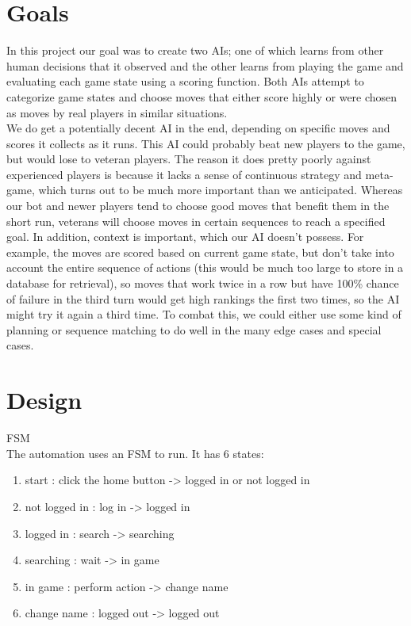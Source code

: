 \documentclass[12pt]{article}
\begin{document}
\section{Goals}
In this project our goal was to create two AIs; one of which learns from other human decisions that it observed and the other learns from playing the game and evaluating each game state using a scoring function.  Both AIs attempt to categorize game states and choose moves that either score highly or were chosen as moves by real players in similar situations. \\

We do get a potentially decent AI in the end, depending on specific moves and scores it collects as it runs.  This AI could probably beat new players to the game, but would lose to veteran players.  The reason it does pretty poorly against experienced players is because it lacks a sense of continuous strategy and meta-game, which turns out to be much more important than we anticipated.  Whereas our bot and newer players tend to choose good moves that benefit them in the short run, veterans will choose moves in certain sequences to reach a specified goal.  In addition, context is important, which our AI doesn't possess.  For example, the moves are scored based on current game state, but don't take into account the entire sequence of actions (this would be much too large to store in a database for retrieval), so moves that work twice in a row but have 100\% chance of failure in the third turn would get high rankings the first two times, so the AI might try it again a third time.  To combat this, we could either use some kind of planning or sequence matching to do well in the many edge cases and special cases.

\section{Design}

FSM \\
The automation uses an FSM to run. It has 6 states:
\begin{enumerate}
  \item start : click the home button -\textgreater{} logged in or not logged in
  \item not logged in : log in -\textgreater{} logged in
  \item logged in : search -\textgreater{} searching
  \item searching : wait -\textgreater{} in game
  \item in game : perform action -\textgreater{} change name
  \item change name : logged out -\textgreater{} logged out
\end{enumerate}
\end{document}
